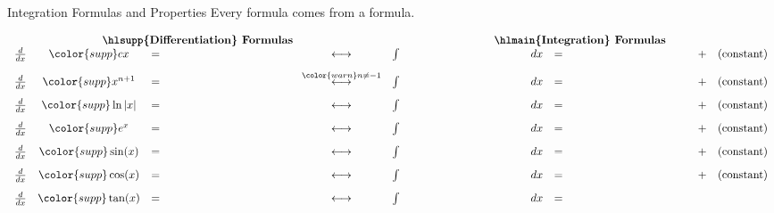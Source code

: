 \documentclass[../main.tex]{subfiles}
\begin{document}
\begin{lesson}{Integration Formulas and Properties} \label{lession:integration-formulas}
  Every  formula comes from a  formula.

  \[
    \begin{array}{rcclcrclllcl} 
      \multicolumn{5}{c}{\text{\textbf{\hlsupp{Differentiation} Formulas}}} & \multicolumn{7}{c}{\text{\textbf{\hlmain{Integration} Formulas}}} \\
      \frac{d}{dx} & {\color{supp} cx} &=& \phantom{\color{main} c}
                   & \longleftrightarrow 
                   & \int & \phantom{\color{main} c} & dx &=& \phantom{\color{supp} cx} 
                   &+& (\text{constant}) \\[2ex]
      \frac{d}{dx} & {\color{supp} x^{n+1}  } &=& \phantom{\color{main} (n+1) x^{n}}
                   & \overset{\color{warn} n \ne -1}{\longleftrightarrow}
                   & \int & \phantom{\color{main} x^{n}} & dx &=& \phantom{\color{supp} \frac{x^{n+1}}{n+1} } 
                   &+& (\text{constant}) \\[2ex]
      \frac{d}{dx} & {\color{supp} \ln|x| } &=& \phantom{\color{main} x^{-1}}
                   & \longleftrightarrow 
                   & \int & \phantom{\color{main} x^{-1}} & dx &=& \phantom{\color{supp} \ln|x|} 
                   &+& (\text{constant}) \\[2ex]
      \frac{d}{dx} & {\color{supp} e^{x}} &=& \phantom{\color{main} e^{x}}
                   & \longleftrightarrow
                   & \int & \phantom{\color{main} e^{x}      } & dx &=& \phantom{\color{supp} e^{x}} 
                   &+& (\text{constant}) \\[2ex]
      \frac{d}{dx} & {\color{supp} \sin(x)} &=& \phantom{\color{main} \cos(x)}
                   & \longleftrightarrow 
                   & \int & \phantom{\color{main} \cos(x)} & dx &=& \phantom{\color{supp} \sin(x)} 
                   &+& (\text{constant}) \\[2ex]
      \frac{d}{dx} & {\color{supp} \cos(x)} &=& \phantom{\color{main} -\sin(x)}
                   & \longleftrightarrow 
                   & \int & \phantom{\color{main} \sin(x)} & dx &=& \phantom{\color{supp} -\cos(x)} 
                   &+& (\text{constant}) \\[2ex]
      \frac{d}{dx} & {\color{supp} \tan(x)} &=& \phantom{\color{main} \sec^{2}(x)}
                   & \longleftrightarrow 
                   & \int & \phantom{\color{main} \sec^{2}(x)} & dx &=& \phantom{\color{supp} \tan(x)} 

\end{array}\]
\end{lesson}
\end{document}
